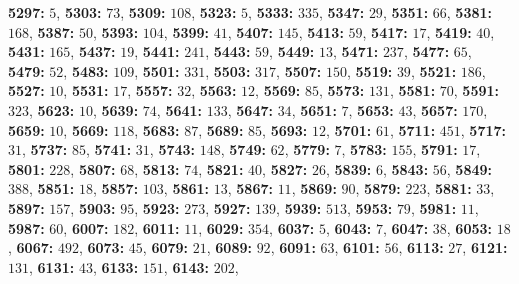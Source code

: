 \textsf{\bfseries 5297:} $5$, \textsf{\bfseries 5303:} $73$, \textsf{\bfseries 5309:} $108$, \textsf{\bfseries 5323:} $5$, \textsf{\bfseries 5333:} $335$, \textsf{\bfseries 5347:} $29$, \textsf{\bfseries 5351:} $66$, \textsf{\bfseries 5381:} $168$, \textsf{\bfseries 5387:} $50$, \textsf{\bfseries 5393:} $104$, \textsf{\bfseries 5399:} $41$, \textsf{\bfseries 5407:} $145$, \textsf{\bfseries 5413:} $59$, \textsf{\bfseries 5417:} $17$, \textsf{\bfseries 5419:} $40$, \textsf{\bfseries 5431:} $165$, \textsf{\bfseries 5437:} $19$, \textsf{\bfseries 5441:} $241$, \textsf{\bfseries 5443:} $59$, \textsf{\bfseries 5449:} $13$, \textsf{\bfseries 5471:} $237$, \textsf{\bfseries 5477:} $65$, \textsf{\bfseries 5479:} $52$, \textsf{\bfseries 5483:} $109$, \textsf{\bfseries 5501:} $331$, \textsf{\bfseries 5503:} $317$, \textsf{\bfseries 5507:} $150$, \textsf{\bfseries 5519:} $39$, \textsf{\bfseries 5521:} $186$, \textsf{\bfseries 5527:} $10$, \textsf{\bfseries 5531:} $17$, \textsf{\bfseries 5557:} $32$, \textsf{\bfseries 5563:} $12$, \textsf{\bfseries 5569:} $85$, \textsf{\bfseries 5573:} $131$, \textsf{\bfseries 5581:} $70$, \textsf{\bfseries 5591:} $323$, \textsf{\bfseries 5623:} $10$, \textsf{\bfseries 5639:} $74$, \textsf{\bfseries 5641:} $133$, \textsf{\bfseries 5647:} $34$, \textsf{\bfseries 5651:} $7$, \textsf{\bfseries 5653:} $43$, \textsf{\bfseries 5657:} $170$, \textsf{\bfseries 5659:} $10$, \textsf{\bfseries 5669:} $118$, \textsf{\bfseries 5683:} $87$, \textsf{\bfseries 5689:} $85$, \textsf{\bfseries 5693:} $12$, \textsf{\bfseries 5701:} $61$, \textsf{\bfseries 5711:} $451$, \textsf{\bfseries 5717:} $31$, \textsf{\bfseries 5737:} $85$, \textsf{\bfseries 5741:} $31$, \textsf{\bfseries 5743:} $148$, \textsf{\bfseries 5749:} $62$, \textsf{\bfseries 5779:} $7$, \textsf{\bfseries 5783:} $155$, \textsf{\bfseries 5791:} $17$, \textsf{\bfseries 5801:} $228$, \textsf{\bfseries 5807:} $68$, \textsf{\bfseries 5813:} $74$, \textsf{\bfseries 5821:} $40$, \textsf{\bfseries 5827:} $26$, \textsf{\bfseries 5839:} $6$, \textsf{\bfseries 5843:} $56$, \textsf{\bfseries 5849:} $388$, \textsf{\bfseries 5851:} $18$, \textsf{\bfseries 5857:} $103$, \textsf{\bfseries 5861:} $13$, \textsf{\bfseries 5867:} $11$, \textsf{\bfseries 5869:} $90$, \textsf{\bfseries 5879:} $223$, \textsf{\bfseries 5881:} $33$, \textsf{\bfseries 5897:} $157$, \textsf{\bfseries 5903:} $95$, \textsf{\bfseries 5923:} $273$, \textsf{\bfseries 5927:} $139$, \textsf{\bfseries 5939:} $513$, \textsf{\bfseries 5953:} $79$, \textsf{\bfseries 5981:} $11$, \textsf{\bfseries 5987:} $60$, \textsf{\bfseries 6007:} $182$, \textsf{\bfseries 6011:} $11$, \textsf{\bfseries 6029:} $354$, \textsf{\bfseries 6037:} $5$, \textsf{\bfseries 6043:} $7$, \textsf{\bfseries 6047:} $38$, \textsf{\bfseries 6053:} $18$, \textsf{\bfseries 6067:} $492$, \textsf{\bfseries 6073:} $45$, \textsf{\bfseries 6079:} $21$, \textsf{\bfseries 6089:} $92$, \textsf{\bfseries 6091:} $63$, \textsf{\bfseries 6101:} $56$, \textsf{\bfseries 6113:} $27$, \textsf{\bfseries 6121:} $131$, \textsf{\bfseries 6131:} $43$, \textsf{\bfseries 6133:} $151$, \textsf{\bfseries 6143:} $202$, 
